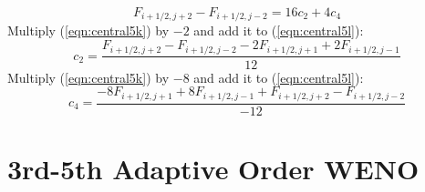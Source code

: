 \documentclass{warpdoc}
\begin{document}
% 
%
\begin{equation}
F_{i+1/2,j+2}-F_{i+1/2,j-2}=  16 c_2  + 4 c_4  
\label{eqn:central5l}
\end{equation}
% 
Multiply (\ref{eqn:central5k}) by $-2$ and add it to (\ref{eqn:central5l}):
%
\begin{equation}
c_2=\frac{F_{i+1/2,j+2}-F_{i+1/2,j-2}-2F_{i+1/2,j+1}+2F_{i+1/2,j-1}}{12}    
\label{eqn:central5_c2}
\end{equation}
% 
Multiply (\ref{eqn:central5k}) by $-8$ and add it to (\ref{eqn:central5l}):
%
\begin{equation}
c_4=\frac{-8F_{i+1/2,j+1}+8F_{i+1/2,j-1}+F_{i+1/2,j+2}-F_{i+1/2,j-2}}{-12}  
\label{eqn:central5_c4}
\end{equation}
% 







\section{3rd-5th Adaptive Order WENO}
\end{document}
